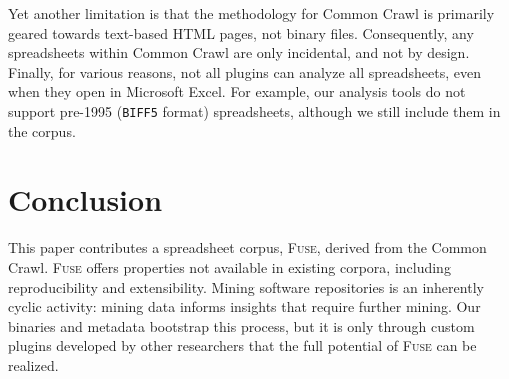 \documentclass[conference]{IEEEtran}
\begin{document}
Yet another limitation is that the methodology for Common Crawl is primarily geared towards text-based HTML pages, not binary files. Consequently, any spreadsheets within Common Crawl are only incidental, and not by design. 
%
Finally, for various reasons, not all plugins can analyze all spreadsheets, even when they open in Microsoft Excel. 
%
For example, our analysis tools do not support pre-1995 (\texttt{BIFF5} format) spreadsheets, although we still include them in the corpus.







\section{Conclusion}

This paper contributes a spreadsheet corpus, \textsc{Fuse}, derived from the Common Crawl. \textsc{Fuse} offers properties not available in existing corpora, including reproducibility and extensibility. Mining software repositories is an inherently cyclic activity: mining data informs insights that require further mining. Our binaries and metadata bootstrap this process, but it is only through custom plugins developed by other researchers that the full potential of \textsc{Fuse} can be realized.
\end{document}
